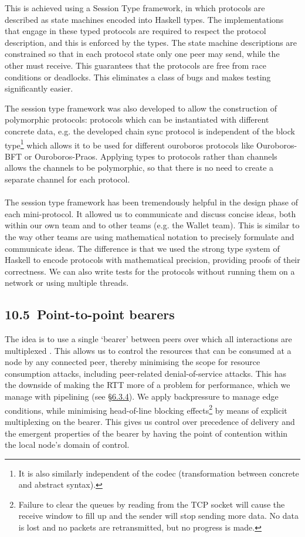 \documentclass[11pt,a4paper]{article}
\begin{document}
This is achieved using a Session Type framework, in which protocols are
described as state machines encoded into Haskell types. The
implementations that engage in these typed protocols are required to
respect the protocol description, and this is enforced by the types. The
state machine descriptions are constrained so that in each protocol
state only one peer may send, while the other must receive. This
guarantees that the protocols are free from race conditions or
deadlocks. This eliminates a class of bugs and makes testing
significantly easier.

The session type framework was also developed to allow the construction
of polymorphic protocols: protocols which can be instantiated with
different concrete data, e.g. the developed chain sync protocol is
independent of the block type\footnote{It is also similarly independent
  of the codec (transformation between concrete and abstract syntax).}
which allows it to be used for different ouroboros protocols like
Ouroboros-BFT or Ouroboros-Praos. Applying types to protocols rather
than channels allows the channels to be polymorphic, so that there is no
need to create a separate channel for each protocol.\\
~\\
The session type framework has been tremendously helpful in the design
phase of each mini-protocol. It allowed us to communicate and discuss
concise ideas, both within our own team and to other teams (e.g. the
Wallet team). This is similar to the way other teams are using
mathematical notation to precisely formulate and communicate ideas. The
difference is that we used the strong type system of Haskell to encode
protocols with mathematical precision, providing proofs of their
correctness. We can also write tests for the protocols without running
them on a network or using multiple threads.

\hypertarget{point-to-point-bearers}{%
\subsection{​10.5​~Point-to-point
bearers}\label{point-to-point-bearers}}

The idea is to use a single `bearer' between peers over which all
interactions are multiplexed . This allows us to control the resources
that can be consumed at a node by any connected peer, thereby minimising
the scope for resource consumption attacks, including peer-related
denial-of-service attacks. This has the downside of making the RTT more
of a problem for performance, which we manage with pipelining (see
\protect\hyperlink{performance}{{§6.3.4}}). We apply backpressure to
manage edge conditions, while minimising head-of-line blocking
effects\footnote{Failure to clear the queues by reading from the TCP
  socket will cause the receive window to fill up and the sender will
  stop sending more data. No data is lost and no packets are
  retransmitted, but no progress is made.} by means of explicit
multiplexing on the bearer. This gives us control over precedence of
delivery and the emergent properties of the bearer by having the point
of contention within the local node's domain of control.
\end{document}
